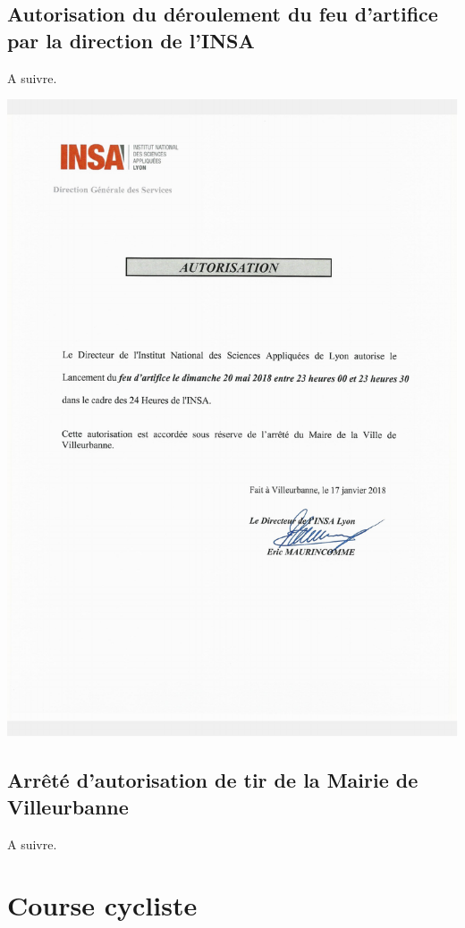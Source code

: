 \documentclass[hidelinks, paper=a4, fontsize=13pt]{report}
\begin{document}
\subsection{Autorisation du déroulement du feu d’artifice par la direction de l’INSA}
A suivre.
\begin{center}
\includegraphics[scale=0.7]{Annexes/Documents/INSAAutorisationFeuArtifice}
\end{center}

\subsection{Arrêté d’autorisation de tir de la Mairie de Villeurbanne}
A suivre.


\newpage
\section{Course cycliste}
\end{document}
